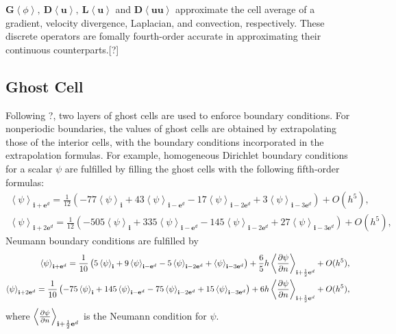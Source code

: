 $\mathbf{G}\left<\phi\right>,\ \mathbf{D}\left<\mathbf{u}\right>,\
\mathbf{L}\left<\mathbf{u}\right>$ and 
$\mathbf{D}\left<\mathbf{uu}\right>$ approximate the cell average of a
gradient, velocity divergence, Laplacian, and convection,
respectively. These discrete operators are fomally fourth-order
accurate in approximating their continuous counterparts.[?]

\subsection{Ghost Cell}
\label{sec:GhostCell}

Following ?, two layers of ghost cells are used to enforce boundary
conditions.  For nonperiodic boundaries, the values of ghost cells are
obtained by extrapolating those of the interior cells, with the
boundary conditions incorporated in the extrapolation formulas. For
example, homogeneous Dirichlet boundary conditions for a scalar $\psi$
are fulfilled by filling the ghost cells with the following
fifth-order formulas:
\begin{equation}
  \label{eq:GhostedDiri}
  \begin{aligned}
    \left<\psi\right>_{\mathbf{i}+\mathbf{e}^d} = \frac{1}{12}\left(
      -77\left<\psi\right>_{\mathbf{i}} +
      43\left<\psi\right>_{\mathbf{i}-\mathbf{e}^d} -
      17\left<\psi\right>_{\mathbf{i}-2\mathbf{e}^d} +
      3\left<\psi\right>_{\mathbf{i}-3\mathbf{e}^d}\right) + O(h^5), \\
    \left<\psi\right>_{\mathbf{i}+2\mathbf{e}^d} = \frac{1}{12}\left(
      -505\left<\psi\right>_{\mathbf{i}} +
      335\left<\psi\right>_{\mathbf{i}-\mathbf{e}^d} -
      145\left<\psi\right>_{\mathbf{i}-2\mathbf{e}^d} +
      27\left<\psi\right>_{\mathbf{i}-3\mathbf{e}^d}\right) + O(h^5),
  \end{aligned}
\end{equation}
Neumann boundary conditions are fulfilled by
\begin{equation}
  \label{eq:GhostedNeumann}
  \begin{aligned}
    \left<\psi\right>_{\mathbf{i}+\mathbf{e}^d} = \frac{1}{10}\left(
      5\left<\psi\right>_{\mathbf{i}} +
      9\left<\psi\right>_{\mathbf{i}-\mathbf{e}^d} -
      5\left<\psi\right>_{\mathbf{i}-2\mathbf{e}^d} +
      \left<\psi\right>_{\mathbf{i}-3\mathbf{e}^d}\right) +
    \frac{6}{5}h\left<\frac{\partial \psi}{\partial n}\right>_{\mathbf{i}+\frac{1}{2}\mathbf{e}^d} + O(h^5), \\
    \left<\psi\right>_{\mathbf{i}+2\mathbf{e}^d} = \frac{1}{10}\left(
      -75\left<\psi\right>_{\mathbf{i}} +
      145\left<\psi\right>_{\mathbf{i}-\mathbf{e}^d} -
      75\left<\psi\right>_{\mathbf{i}-2\mathbf{e}^d} +
      15\left<\psi\right>_{\mathbf{i}-3\mathbf{e}^d}\right) +
    6h\left<\frac{\partial \psi}{\partial n}\right>_{\mathbf{i}+\frac{1}{2}\mathbf{e}^d}
    + O(h^5),
  \end{aligned}
\end{equation}
where
$\left<\frac{\partial \psi}{\partial n}\right>_{\mathbf{i}+\frac{1}{2}\mathbf{e}^d} $
is the Neumann condition for $\psi$. 

